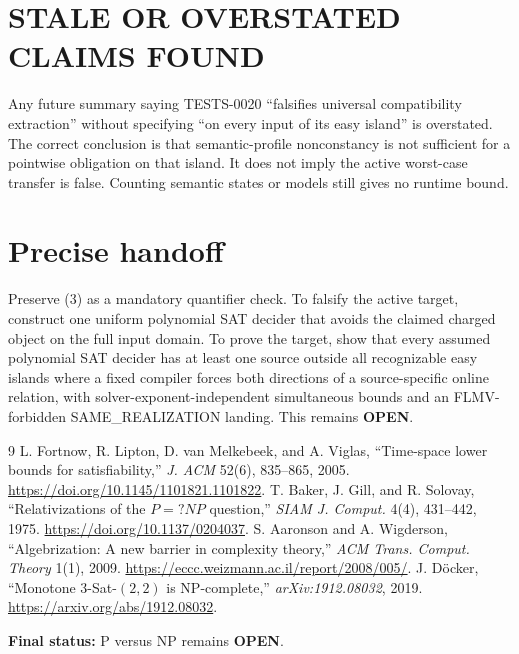 \documentclass[11pt]{article}
\newcommand{\OPEN}{\textbf{OPEN}}
\begin{document}
\section{STALE OR OVERSTATED CLAIMS FOUND}

Any future summary saying TESTS-0020 ``falsifies universal compatibility
extraction'' without specifying ``on every input of its easy island'' is
overstated.  The correct conclusion is that semantic-profile nonconstancy is
not sufficient for a pointwise obligation on that island.  It does not imply
the active worst-case transfer is false.  Counting semantic states or models
still gives no runtime bound.

\section{Precise handoff}

Preserve (3) as a mandatory quantifier check.  To falsify the active target,
construct one uniform polynomial SAT decider that avoids the claimed charged
object on the full input domain.  To prove the target, show that every assumed
polynomial SAT decider has at least one source outside all recognizable easy
islands where a fixed compiler forces both directions of a source-specific
online relation, with solver-exponent-independent simultaneous bounds and an
FLMV-forbidden SAME\_REALIZATION landing.  This remains \OPEN.

\begin{thebibliography}{9}
L. Fortnow, R. Lipton, D. van Melkebeek, and A. Viglas,
``Time-space lower bounds for satisfiability,'' \emph{J. ACM} 52(6),
835--865, 2005. \url{https://doi.org/10.1145/1101821.1101822}.
T. Baker, J. Gill, and R. Solovay, ``Relativizations of the $P=?NP$
question,'' \emph{SIAM J. Comput.} 4(4), 431--442, 1975.
\url{https://doi.org/10.1137/0204037}.
S. Aaronson and A. Wigderson, ``Algebrization: A new barrier in complexity
theory,'' \emph{ACM Trans. Comput. Theory} 1(1), 2009.
\url{https://eccc.weizmann.ac.il/report/2008/005/}.
J. D\"ocker, ``Monotone 3-Sat-$(2,2)$ is NP-complete,''
\emph{arXiv:1912.08032}, 2019.
\url{https://arxiv.org/abs/1912.08032}.
\end{thebibliography}

\noindent\textbf{Final status:} P versus NP remains \OPEN.

\end{document}

